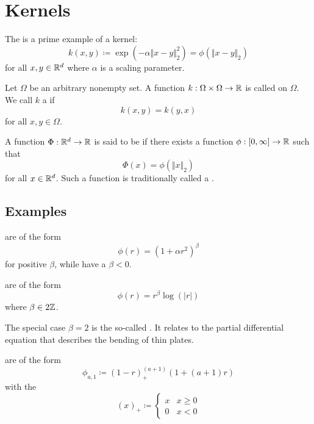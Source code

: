 \section{Kernels}

\begin{*definition}
    The  is a prime example of a kernel:
    \[k(x,y)\coloneqq \exp\left(-\alpha\Vert x-y\Vert_2^2\right)=\phi(\Vert x-y\Vert_2)\]
    for all $x,y\in\mathbb{R}^d$ where $\alpha$ is a scaling parameter.    
\end{*definition}

\begin{definition}\label{def:1.1}
    Let $\Omega$ be an arbitrary nonempty set. 
    A function $k:\Omega\times \Omega\to\mathbb{R}$ is called  on $\Omega$.
    We call $k$ a  if 
    \[k(x,y)=k(y,x)\]
    for all $x,y\in\Omega$.
\end{definition}

\begin{definition}\label{def:1.2}
    A function $\Phi:\mathbb{R}^d\to\mathbb{R}$ is said to be  if there exists a function $\phi:[0,\infty]\to\mathbb{R}$
    such that 
    \[\Phi(x)=\phi(\Vert x\Vert_2)\]
    for all $x\in\mathbb{R}^d$. Such a function is traditionally called a .
\end{definition}

\subsection{Examples}

\begin{example}
     are of the form 
    \[\phi(r)=(1+\alpha r^2)^\beta\]
    for positive $\beta$, while 
    have a $\beta<0$.
\end{example}
\begin{example}
    are of the form
    \[\phi(r)=r^\beta \log (|r|)\]
    where $\beta\in2\mathbb{Z}$.
    
    The special case $\beta=2$ is the so-called .
    It relates to the partial differential equation that describes the bending of thin plates.
\end{example}
\begin{example}
    are of the form 
   \[\phi_{a,1}\coloneqq (1-r)_+^{(a+1)}(1+(a+1)r)\]
   with the 
   \[(x)_+\coloneqq \begin{cases}
    x & x\geq 0\\
    0 & x <0
   \end{cases}\] 
\end{example}

